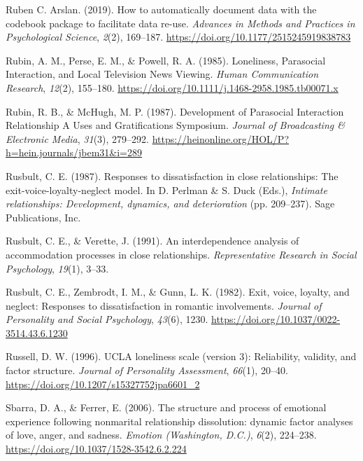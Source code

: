 \documentclass[
]{udthesis}
\newlength{\cslhangindent}
\newenvironment{CSLReferences}[2] %
 {\begin{list}{}{%
  \setlength{\itemindent}{0pt}
  \setlength{\leftmargin}{0pt}
  \setlength{\parsep}{0pt}
  \ifodd #1
   \setlength{\leftmargin}{\cslhangindent}
   \setlength{\itemindent}{-1\cslhangindent}
  \fi
  \setlength{\itemsep}{#2\baselineskip}}}
 {\end{list}}
\begin{document}
\begin{CSLReferences}{1}{0}
Ruben C. Arslan. (2019). How to automatically document data with the codebook package to facilitate data re-use. \emph{Advances in Methods and Practices in Psychological Science}, \emph{2}(2), 169--187. \url{https://doi.org/10.1177/2515245919838783}

Rubin, A. M., Perse, E. M., \& Powell, R. A. (1985). Loneliness, Parasocial Interaction, and Local Television News Viewing. \emph{Human Communication Research}, \emph{12}(2), 155--180. \url{https://doi.org/10.1111/j.1468-2958.1985.tb00071.x}

Rubin, R. B., \& McHugh, M. P. (1987). Development of Parasocial Interaction Relationship A Uses and Gratifications Symposium. \emph{Journal of Broadcasting \& Electronic Media}, \emph{31}(3), 279--292. \url{https://heinonline.org/HOL/P?h=hein.journals/jbem31&i=289}

Rusbult, C. E. (1987). Responses to dissatisfaction in close relationships: {The} exit-voice-loyalty-neglect model. In D. Perlman \& S. Duck (Eds.), \emph{Intimate relationships: {Development}, dynamics, and deterioration} (pp. 209--237). {Sage Publications, Inc}.

Rusbult, C. E., \& Verette, J. (1991). An interdependence analysis of accommodation processes in close relationships. \emph{Representative Research in Social Psychology}, \emph{19}(1), 3--33.

Rusbult, C. E., Zembrodt, I. M., \& Gunn, L. K. (1982). Exit, voice, loyalty, and neglect: {Responses} to dissatisfaction in romantic involvements. \emph{Journal of Personality and Social Psychology}, \emph{43}(6), 1230. \url{https://doi.org/10.1037/0022-3514.43.6.1230}

Russell, D. W. (1996). UCLA loneliness scale (version 3): Reliability, validity, and factor structure. \emph{Journal of Personality Assessment}, \emph{66}(1), 20--40. \url{https://doi.org/10.1207/s15327752jpa6601_2}

Sbarra, D. A., \& Ferrer, E. (2006). The structure and process of emotional experience following nonmarital relationship dissolution: dynamic factor analyses of love, anger, and sadness. \emph{Emotion (Washington, D.C.)}, \emph{6}(2), 224--238. \url{https://doi.org/10.1037/1528-3542.6.2.224}


\end{CSLReferences}
\end{document}
